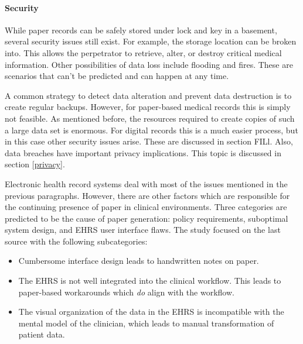     \paragraph{Security} While paper records can be safely stored under lock and key in a basement, several security issues still exist. For example, the storage location can be broken into. This allows the perpetrator to retrieve, alter, or destroy critical medical information. Other possibilities of data loss include flooding and fires. These are scenarios that can't be predicted and can happen at any time. 

    A common strategy to detect data alteration and prevent data destruction is to create regular backups. However, for paper-based medical records this is simply not feasible. As mentioned before, the resources required to create copies of such a large data set is enormous. For digital records this is a much easier process, but in this case other security issues arise. These are discussed in section FILl. Also, data breaches have important privacy implications. This topic is discussed in section \ref{privacy}.\bigskip %

    \noindent Electronic health record systems deal with most of the issues mentioned in the previous paragraphs. However, there are other factors which are responsible for the continuing presence of paper in clinical environments. Three categories are predicted to be the cause of paper generation: policy requirements, suboptimal system design, and EHRS user interface flaws\cite{Saleem2009}. The study focused on the last source with the following subcategories:
    \begin{itemize}
        \item Cumbersome interface design leads to handwritten notes on paper.
        \item The EHRS is not well integrated into the clinical workflow. This leads to paper-based workarounds which \emph{do} align with the workflow.
        \item The visual organization of the data in the EHRS is incompatible with the mental model of the clinician, which leads to manual transformation of patient data.
    \end{itemize}


